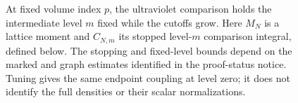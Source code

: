 \begin{figure}[ht]
\centering
{}
\caption{At fixed volume index $p$, the ultraviolet comparison holds the intermediate level $m$ fixed while the cutoffs grow. Here $M_N$ is a lattice moment and $C_{N,m}$ its stopped level-$m$ comparison integral, defined below. The stopping and fixed-level bounds depend on the marked and graph estimates identified in the proof-status notice. Tuning gives the same endpoint coupling at level zero; it does not identify the full densities or their scalar normalizations.}\label{fig:rg-cutoff-comparison}
\end{figure}
